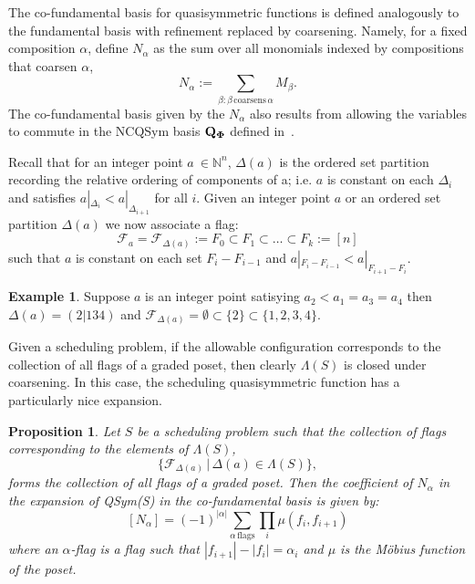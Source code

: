\documentclass[12pt,reqno]{amsart}
\numberwithin{definition}{section}
\newtheorem{proposition}[definition]{Proposition}
\theoremstyle{definition}
\newtheorem{example}[definition]{Example}
\newcommand{\ncM}{\mathcal{M}}
\newcommand{\ncN}{\mathcal{N}}
\newcommand{\allow}{\Lambda} %
\begin{document}
 The co-fundamental basis for quasisymmetric functions is
 defined analogously to the fundamental basis with refinement replaced by coarsening.  Namely, for a fixed composition $\alpha$, define $N_{\alpha}$ as the sum over all monomials indexed by compositions that coarsen $\alpha$,
$$N_{\alpha} := \sum_{\beta : \beta \, \textrm{coarsens} \, \alpha} M_{\beta}.$$
The co-fundamental basis given by the $N_{\alpha}$ also results from allowing the variables to commute in the NCQSym basis ${\bf {Q}_{\Phi}}$ defined in~\cite{Zab}.





  Recall that for an integer point $a\ \in \mathbb{N}^n$,
  $\Delta(a)$ is the ordered set partition recording the relative
  ordering of components of a; i.e. $a$ is constant on each $\Delta_i$
  and satisfies $a|_{\Delta_i} < a|_{\Delta_{i+1}}$ for all $i$.
Given an integer point $a$ or an ordered set partition $\Delta(a)$ we now associate a flag:
$$\mathcal{F}_{a} = \mathcal{F}_{\Delta(a)} := F_0 \subset F_1 \subset \ldots \subset F_k := [n]$$
such that $a$ is constant on each set $F_i - F_{i-1}$ and  $a|_{F_i -
  F_{i-1}} < a|_{F_{i+1} - F_{i}} $. 

\begin{example}
Suppose $a$ is an integer point satisying $a_2 < a_1 = a_3 = a_4$ then $\Delta(a) = (2|134)$ and $\mathcal{F}_{\Delta(a)} = {\emptyset \subset \{2\} \subset \{1,2,3,4\}}$.
\end{example}



Given a scheduling problem, if the allowable configuration corresponds
to the collection of all flags of a graded poset, then clearly $\allow(S)$ is closed under coarsening.  In this case, the scheduling 
quasisymmetric function has a particularly nice expansion.

\begin{proposition}
\label{prop:flags}
Let $S$ be a scheduling problem such that the collection of flags corresponding to the elements of $\allow(S)$,
$$\{ \mathcal{F}_{\Delta(a)} \, | \, \Delta(a) \in \allow(S) \},$$
forms the collection of all flags of a graded poset.  Then the coefficient of $N_{\alpha}$ in the expansion of QSym(S) in the co-fundamental basis is given by:
$$[N_{\alpha}] = (-1)^{|\alpha|} \sum_{\alpha \, \textrm{flags}} \prod_i \mu(f_i,f_{i+1})$$
where an $\alpha$-flag is a flag such that $|f_{i+1}| - |f_i| = \alpha_i$ and $\mu$ is the M\"{o}bius function of the poset.
\end{proposition}
\end{document}
